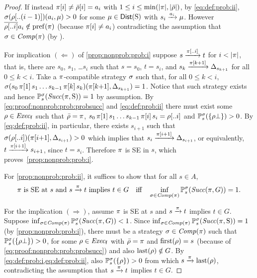 \begin{proof}
  If instead $\pi[i]\neq\bar{\rho}[i]=a_i$ with
  $1\leq i \leq\min({|}{\pi}{|},{|}{\bar{\rho}}{|})$, by \cref{eq:def:prob:ii},
  $\sigma(\rho[..(i-1)])(a_i,\mu) > 0$ for some
  $\mu\in\mathsf{Dist}(\operatorname{S})$ with $s_i\xrightarrow{a_i}\mu$.
  However $\overline{\rho[..i]}a_i \notin \mathrm{pref}(\pi)$
  (because $\pi[i]\neq a_i$) contradicting the assumption that
  $\sigma\in\mathit{Comp}(\pi)$ (by ).


  For implication $(\Leftarrow)$ of \cref{prop:nonprob:prob:i} suppose
  $s\xrightarrow{\pi[..i]}t$ for $i<{|}{\pi}{|}$, that is, there are $s_0$,
  $s_1$, \ldots $s_i$ such that $s=s_0$, $t=s_i$, and
  $s_k\xrightarrow{\pi[k{+}1]}\Delta_{s_{k{+}1}}$ for all $0\leq k < i$.
  Take a $\pi$-compatible strategy $\sigma$ such that, for all
  $0\leq k < i$,
  $\sigma(s_0\,\pi[1]\,s_1\ldots s_{k{-}1}\,\pi[k]\,s_k)(\pi[k{+}1],\Delta_{s_{k{+}1}})=1$.
  Notice that such strategy exists and hence
  $\mathbb{P}^\sigma_s(\mathit{Succ}(\pi,\operatorname{S}))=1$ by assumption.
  By \cref{eq:proof:nonprob:prob:probsucc} and \cref{eq:def:prob:ii}
  there must exist some $\rho\in\mathit{Exec}_{\mathsf{f}}$ such that $\bar{\rho}=\pi$,
  $s_0\,\pi[1]\,s_1\ldots s_{k{-}1}\,\pi[i]\,s_i = \rho[..i]$ and
  $\mathbb{P}^\sigma_s(\{\rho\bot\})>0$.  By \cref{eq:def:prob:ii}, in
  particular, there exists $s_{i{+}1}$ such that
  $\sigma(\rho[..i])(\pi[i{+}1],\Delta_{s_{i{+}1}})> 0$ which
  implies that $s_i\xrightarrow{\pi[i{+}1]}\Delta_{s_{i{+}1}}$, or
  equivalently, $t\xrightarrow{\pi[i{+}1]}s_{i{+}1}$, since $t=s_i$.
  Therefore $\pi$ is SE in $s$, which proves~\cref{prop:nonprob:prob:i}.

  For \cref{prop:nonprob:prob:ii}, it suffices to show that for all
  $s\in A$,
  \[
    \pi \text{ is SE at } s \text{ and } s \xrightarrow{\pi} t \text{ implies }
    t\in G \quad
    \text{iff}\quad
    \inf_{\sigma\in\mathit{Comp}(\pi)}\mathbb{P}^\sigma_s(\mathit{Succ}(\pi,G))=1.
  \]
  
  For the implication $(\Rightarrow)$, assume $\pi$ is SE at $s$ and
  $s \xrightarrow{\pi} t$ implies $t\in G$.
  Suppose
  $\inf_{\sigma\in\mathit{Comp}(\pi)}\mathbb{P}^\sigma_s(\mathit{Succ}(\pi,G))<1$.
  Since
  $\inf_{\sigma\in\mathit{Comp}(\pi)}\mathbb{P}^\sigma_s(\mathit{Succ}(\pi,\operatorname{S}))=1$ (by
  \cref{prop:nonprob:prob:i}), there must be a strategy
  $\sigma\in\mathit{Comp}(\pi)$ such that
  $\mathbb{P}^\sigma_s(\{\rho\bot\})>0$, for some $\rho\in\mathit{Exec}_{\mathsf{f}}$ with
  $\bar{\rho}=\pi$ and $\mathrm{first}(\rho)=s$ (because of
  \cref{eq:proof:nonprob:prob:probsucc}) and also $\mathrm{last}(\rho)\notin G$.
  By \cref{eq:def:prob:i,eq:def:prob:ii}, also
  $\mathbb{P}^\sigma_s(\{\rho\})>0$ from which $s\xrightarrow{\pi}\mathrm{last}(\rho)$,
  contradicting the assumption that $s \xrightarrow{\pi} t$ implies
  $t\in G$.


\end{proof}
